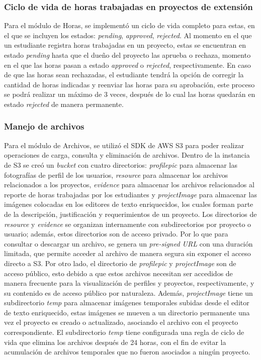 \subsubsection{Ciclo de vida de horas trabajadas en proyectos de extensión}
Para el módulo de Horas, se implementó un ciclo de vida completo para estas, en el que se incluyen los estados:  \textit{pending},
\textit{approved}, \textit{rejected}. Al momento en el que un estudiante registra horas trabajadas en un proyecto, estas se
encuentran en estado \textit{pending} hasta que el dueño del proyecto las aprueba o rechaza, momento en el que las horas pasan a
estado \textit{approved} o \textit{rejected}, respectivamente. En caso de que las horas sean rechazadas, el estudiante tendrá la
opción de corregir la cantidad de horas indicadas y reenviar las horas para su aprobación, este proceso se podrá realizar un
máximo de 3 veces, después de lo cual las horas quedarán en estado \textit{rejected} de manera permanente.

\subsubsection{Manejo de archivos}
Para el módulo de Archivos, se utilizó el SDK de AWS S3 para poder realizar operaciones de carga, consulta y eliminación de
archivos. Dentro de la instancia de S3 se creó un \textit{bucket} con cuatro directorios: \textit{profilepic} para almacenar las
fotografías de perfil de los usuarios, \textit{resource} para almacenar los archivos relacionados a los proyectos,
\textit{evidence} para almacenar los archivos relacionados al reporte de horas trabajadas por los estudiantes y \textit{projectImage}
para almacenar las imágenes colocadas en los editores de texto enriquecidos, los cuales forman parte de la descripción, justificación
y requerimientos de un proyecto. Los directorios de \textit{resource} y \textit{evidence} se organizan internamente con subdirectorios
por proyecto o usuario; además, estos directorios son de acceso privado. Por lo que para consultar o descargar un archivo, se genera un 
\textit{pre-signed URL} con una duración limitada, que permite acceder al archivo de manera segura sin exponer el acceso 
directo a S3. Por otro lado, el directorio de \textit{profilepic} y \textit{projectImage} son de acceso público, esto debido a que
estos archivos necesitan ser accedidos de manera frecuente para la visualización de perfiles y proyectos, respectivamente, y su contenido
es de acceso público por naturaleza.
Además, \textit{projectImage} tiene un subdirectorio \textit{temp} para almacenar imágenes temporales subidas desde el editor de texto
enriquecido, estas imágenes se mueven a un directorio permanente una vez el proyecto es creado o actualizado, asociando el archivo con
el proyecto correspondiente. El subdirectorio \textit{temp} tiene configurada una regla de ciclo de vida que elimina los archivos
después de 24 horas, con el fin de evitar la acumulación de archivos temporales que no fueron asociados a ningún proyecto.

